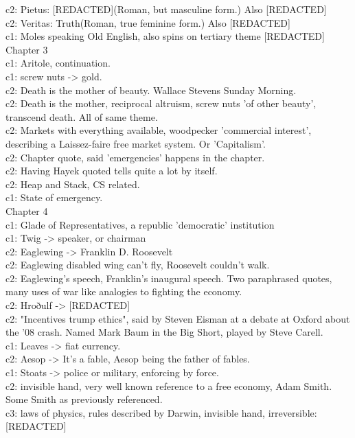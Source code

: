 c2: Pietus: [REDACTED](Roman, but masculine form.) Also [REDACTED]\\
c2: Veritas: Truth(Roman, true feminine form.) Also [REDACTED]\\
c1: Moles speaking Old English, also spins on tertiary theme [REDACTED]\\
Chapter 3\\[0.1cm]
c1: Aritole, continuation.\\
c1: screw nuts -> gold.\\
c2: Death is the mother of beauty. Wallace Stevens Sunday Morning.\\
c2: Death is the mother, reciprocal altruism, screw nuts 'of other beauty', transcend death. All of same theme.\\
c2: Markets with everything available, woodpecker 'commercial interest', describing a Laissez-faire free market system. Or 'Capitalism'.\\
c2: Chapter quote, said 'emergencies' happens in the chapter.\\
c2: Having Hayek quoted tells quite a lot by itself.\\
c2: Heap and Stack, CS related.\\
c1: State of emergency.\\
Chapter 4\\[0.1cm]
c1: Glade of Representatives, a republic 'democratic' institution\\
c1: Twig -> speaker, or chairman\\
c2: Eaglewing -> Franklin D. Roosevelt\\
c2: Eaglewing disabled wing can't fly, Roosevelt couldn't walk.\\
c2: Eaglewing's speech, Franklin's inaugural speech. Two paraphrased quotes, many uses of war like analogies to fighting the economy.\\
c2: Hroðulf -> [REDACTED]\\
c2: "Incentives trump ethics", said by Steven Eisman at a debate at Oxford about the '08 crash. Named Mark Baum in the Big Short, played by Steve Carell.\\
c1: Leaves -> fiat currency.\\
c2: Aesop -> It's a fable, Aesop being the father of fables.\\
c1: Stoats -> police or military, enforcing by force.\\
c2: invisible hand, very well known reference to a free economy, Adam Smith. Some Smith as previously referenced.\\
c3: laws of physics, rules described by Darwin, invisible hand, irreversible: [REDACTED]
